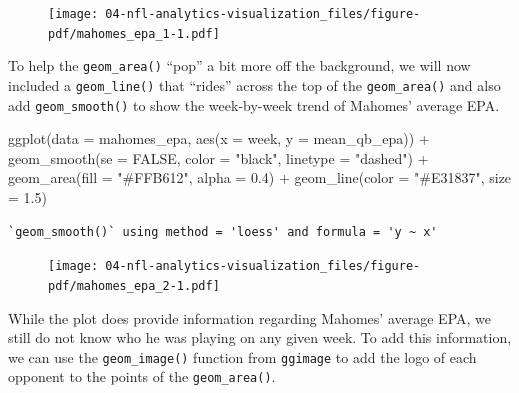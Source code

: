 \documentclass[
  letterpaper,
]{krantz}
\newenvironment{Shaded}{\begin{snugshade}}{\end{snugshade}}
\newcommand{\AttributeTok}[1]{\textcolor[rgb]{0.40,0.45,0.13}{#1}}
\newcommand{\ConstantTok}[1]{\textcolor[rgb]{0.56,0.35,0.01}{#1}}
\newcommand{\FloatTok}[1]{\textcolor[rgb]{0.68,0.00,0.00}{#1}}
\newcommand{\FunctionTok}[1]{\textcolor[rgb]{0.28,0.35,0.67}{#1}}
\newcommand{\NormalTok}[1]{\textcolor[rgb]{0.00,0.23,0.31}{#1}}
\newcommand{\SpecialCharTok}[1]{\textcolor[rgb]{0.37,0.37,0.37}{#1}}
\newcommand{\StringTok}[1]{\textcolor[rgb]{0.13,0.47,0.30}{#1}}
\begin{document}
\begin{figure}[H]

{\centering \texttt{[image: 04-nfl-analytics-visualization\_files/figure-pdf/mahomes\_epa\_1-1.pdf]}

}

\end{figure}

To help the \texttt{geom\_area()} ``pop'' a bit more off the background,
we will now included a \texttt{geom\_line()} that ``rides'' across the
top of the \texttt{geom\_area()} and also add \texttt{geom\_smooth()} to
show the week-by-week trend of Mahomes' average EPA.

\begin{Shaded}
\begin{Highlighting}[]
\FunctionTok{ggplot}\NormalTok{(}\AttributeTok{data =}\NormalTok{ mahomes\_epa, }\FunctionTok{aes}\NormalTok{(}\AttributeTok{x =}\NormalTok{ week, }\AttributeTok{y =}\NormalTok{ mean\_qb\_epa)) }\SpecialCharTok{+}
  \FunctionTok{geom\_smooth}\NormalTok{(}\AttributeTok{se =} \ConstantTok{FALSE}\NormalTok{, }\AttributeTok{color =} \StringTok{"black"}\NormalTok{, }\AttributeTok{linetype =} \StringTok{"dashed"}\NormalTok{) }\SpecialCharTok{+}
  \FunctionTok{geom\_area}\NormalTok{(}\AttributeTok{fill =} \StringTok{"\#FFB612"}\NormalTok{, }\AttributeTok{alpha =} \FloatTok{0.4}\NormalTok{) }\SpecialCharTok{+}
  \FunctionTok{geom\_line}\NormalTok{(}\AttributeTok{color =} \StringTok{"\#E31837"}\NormalTok{, }\AttributeTok{size =} \FloatTok{1.5}\NormalTok{)}
\end{Highlighting}
\end{Shaded}

\begin{verbatim}
`geom_smooth()` using method = 'loess' and formula = 'y ~ x'
\end{verbatim}

\begin{figure}[H]

{\centering \texttt{[image: 04-nfl-analytics-visualization\_files/figure-pdf/mahomes\_epa\_2-1.pdf]}

}

\end{figure}

While the plot does provide information regarding Mahomes' average EPA,
we still do not know who he was playing on any given week. To add this
information, we can use the \texttt{geom\_image()} function from
\texttt{ggimage} to add the logo of each opponent to the points of the
\texttt{geom\_area()}.
\end{document}
